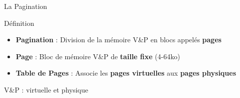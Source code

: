 \documentclass[8pt]{beamer}
\begin{document}
\begin{frame}{La Pagination}
    \begin{block}{D\'efinition}
        \begin{itemize}
            \item \textbf{Pagination} : Division de la mémoire V\&P	en
                  blocs appelés \textbf{pages}
            \item \textbf{Page} : Bloc de mémoire V\&P de \textbf{taille fixe}
                  (4-64ko)
            \item \textbf{Table de Pages} : Associe les \textbf{pages
                      virtuelles} aux \textbf{pages physiques}
        \end{itemize}
        V\&P : virtuelle et physique
    \end{block}
\end{frame}
\end{document}
